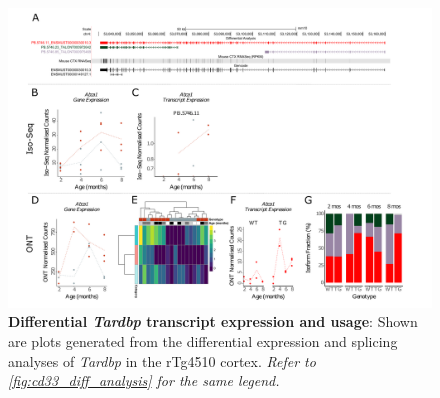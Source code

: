 \begin{landscape}
	\begin{figure}[htp]
		\begin{center}
			\includegraphics[page=17,trim={0 0.5cm 0 1.5cm},scale =0.85]{Figures/TargetGene_DifferentialAnalysis.pdf}
		\end{center}
		\captionsetup{width=1.5\textwidth}
		\caption[Differential \textit{Tardbp} transcript expression and usage]%
		{\textbf{Differential \textit{Tardbp} transcript expression and usage}: Shown are plots generated from the differential expression and splicing analyses of \textit{Tardbp} in the rTg4510 cortex. \textit{Refer to \cref{fig:cd33_diff_analysis} for the same legend.}}   
		\label{fig:Tardbp_diff_analysis}
	\end{figure}
\end{landscape}

